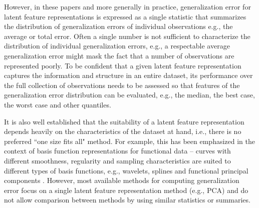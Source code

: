 However, in these papers and more generally in practice, generalization error for latent feature representations is expressed as a single statistic that summarizes the distribution of generalization errors of individual observations e.g., the average or total error.
Often a single number is not sufficient to characterize the distribution of individual generalization errors, e.g., a respectable average generalization error might mask the fact that a number of observations are represented poorly. 
To be confident that a given latent feature representation captures the information and structure in an entire dataset, its performance over the full collection of observations needs to be assessed so that features of the generalization error distribution can be evaluated, e.g., the median, the best case, the worst case and other quantiles.

It is also well established that the suitability of a latent feature representation depends heavily on the characteristics of the dataset at hand, i.e., there is no preferred ``one size fits all" method.
For example, this has been emphasized in the context of basis function representations for functional data -- curves with different smoothness, regularity and sampling characteristics are suited to different types of basis functions, e.g., wavelets, splines and functional principal components \textcite[Section 3, pp. 325--328]{morris_functional_2015}.
However, most available methods for computing generalization error focus on a single latent feature representation method (e.g., PCA) and do not allow comparison between methods by using similar statistics or summaries.

